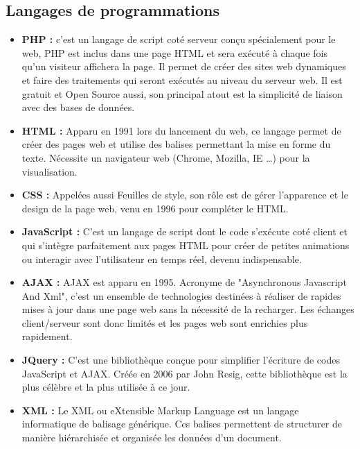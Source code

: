 \documentclass{report}
\begin{document}
\subsection{Langages de programmations}
\begin{itemize}
    \item \textbf{PHP :} c’est un langage de script coté serveur conçu spécialement pour le web, PHP est inclus dans une page HTML et sera exécuté à chaque fois qu’un visiteur affichera la page. Il permet de créer des sites web dynamiques et faire des traitements qui seront exécutés au niveau du serveur web. Il  est gratuit et Open Source aussi, son principal atout est la simplicité de liaison avec des bases de données.\cite{web}\\ 
    \item \textbf{HTML :} Apparu en 1991 lors du lancement du web, ce langage permet de créer des pages web et utilise des balises permettant la mise en forme du texte. Nécessite un navigateur web (Chrome, Mozilla, IE …) pour la visualisation.\cite{web}\\ 
    \item \textbf{CSS :} Appelées aussi Feuilles de style, son rôle est de gérer l’apparence et le design de la page web, venu en 1996 pour compléter le HTML.\cite{css}\\
    \item \textbf{JavaScript :} C’est un langage de script dont le code s’exécute coté client  et qui s’intègre parfaitement aux pages HTML pour créer de petites animations ou interagir avec l’utilisateur en temps réel, devenu indispensable.\cite{web}\\
    \item \textbf{AJAX :} AJAX est apparu en 1995. Acronyme de "Asynchronous Javascript And Xml", c'est un ensemble de technologies destinées à réaliser de rapides mises à jour dans une page web sans la nécessité de la recharger. Les échanges client/serveur sont donc limités et les pages web sont enrichies plus rapidement.\\
    \item \textbf{JQuery :} C'est une bibliothèque conçue pour simplifier l'écriture de codes JavaScript et AJAX. Créée en 2006 par John Resig, cette bibliothèque est la plus célèbre et la plus utilisée à ce jour.\cite{jquery}\\
    \item \textbf{XML :} Le XML ou eXtensible Markup Language est un langage informatique de balisage générique. Ces balises permettent de structurer de manière hiérarchisée et organisée les données d'un document.\cite{xml}\\
\end{itemize}
\end{document}
